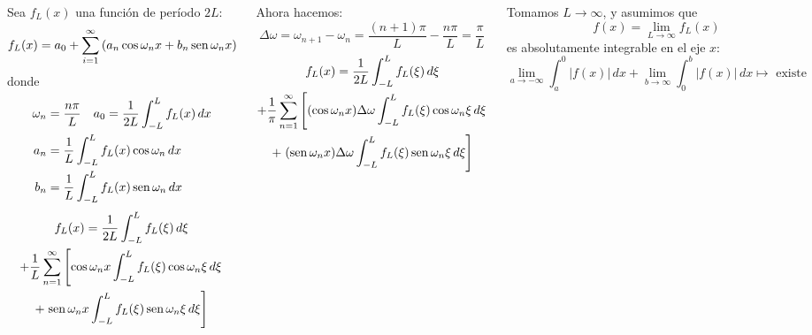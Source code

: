 \documentclass[9pt, aspectratio=169]{beamer}
\begin{document}
\begin{frame}
\begin{columns}[t]
\cx
Sea $f_L(x)$ una función de período $2L$:
\[ f_L(x) = a_0 + \sum_{i = 1}^{\infty} \left( a_n \cos \omega_n x + b_n \operatorname{sen} \omega_n x \right) \]
donde
\begin{align*}
    \omega_n &= \frac{n \pi}{L} \quad a_0= \frac{1}{2L} \int_{-L}^{L} f_L(x) \, dx \\
    a_n &= \frac{1}{L} \int_{-L}^{L} f_L(x) \cos \omega_n \, dx \\
    b_n &= \frac{1}{L} \int_{-L}^{L} f_L(x) \operatorname{sen} \omega_n \, dx \\
\end{align*} \vspace{-3em}
\begin{multline*}
    f_L(x) = \frac{1}{2L} \int_{-L}^{L} f_L(\xi) \, d\xi \\
    + \frac{1}{L}\sum_{n = 1}^{\infty} \left[ \cos \omega_n x \int_{-L}^L f_L(\xi) \cos \omega_n \xi \, d\xi \right. \\
    + \left. \operatorname{sen} \omega_n x \int_{-L}^L f_L(\xi) \operatorname{sen} \omega_n \xi \, d\xi \right]
\end{multline*}
\pause

\cx
Ahora hacemos:
\[ \Delta \omega = \omega_{n+1} - \omega_n = \frac{(n + 1) \pi}{L} - \frac{n \pi}{L} = \frac{\pi}{L} \]
\begin{multline*}
    f_L(x) = \frac{1}{2L} \int_{-L}^{L} f_L(\xi) \, d\xi \\
    + \frac{1}{\pi}\sum_{n = 1}^{\infty} \left[ (\cos \omega_n x) \Delta \omega \int_{-L}^L f_L(\xi) \cos \omega_n \xi \, d\xi \right. \\
    + \left. (\operatorname{sen} \omega_n x) \Delta \omega \int_{-L}^L f_L(\xi) \operatorname{sen} \omega_n \xi \, d\xi \right]
\end{multline*}
\pause

Tomamos $L \rightarrow \infty$, y asumimos que
\[f(x) = \lim_{L \rightarrow \infty} f_L(x) \]
es \alert{absolutamente} integrable en el eje $x$:
\[ \lim_{a \rightarrow -\infty} \int_a^0 |f(x)| \, dx +  \lim_{b \rightarrow \infty} \int_0^b |f(x)| \, dx \mapsto \text{ existe} \]
\end{columns}
\end{frame}
\end{document}
